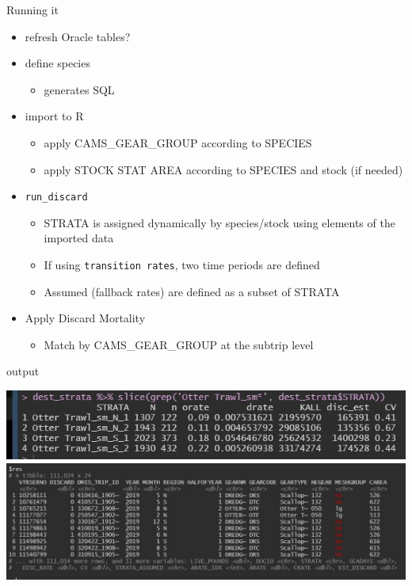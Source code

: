 \documentclass[
  ignorenonframetext,
]{beamer}
\providecommand{\tightlist}{%
  \setlength{\itemsep}{0pt}\setlength{\parskip}{0pt}}
\begin{document}
\begin{frame}[fragile]{Running it}
\protect\hypertarget{running-it}{}

\begin{itemize}
\tightlist
\item
  refresh Oracle tables?
\item
  define species

  \begin{itemize}
  \tightlist
  \item
    generates SQL
  \end{itemize}
\item
  import to R

  \begin{itemize}
  \tightlist
  \item
    apply CAMS\_GEAR\_GROUP according to SPECIES
  \item
    apply STOCK STAT AREA according to SPECIES and stock (if needed)
  \end{itemize}
\item
  \texttt{run\_discard}

  \begin{itemize}
  \tightlist
  \item
    STRATA is assigned dynamically by species/stock using elements of
    the imported data
  \item
    If using \texttt{transition\ rates}, two time periods are defined
  \item
    Assumed (fallback rates) are defined as a subset of STRATA
  \end{itemize}
\item
  Apply Discard Mortality

  \begin{itemize}
  \tightlist
  \item
    Match by CAMS\_GEAR\_GROUP at the subtrip level
  \end{itemize}
\end{itemize}

\end{frame}

\begin{frame}{output}
\protect\hypertarget{output}{}

\includegraphics[width = \textwidth]{dest_strata_squid_ex.jpg}
\vspace{2cm} \includegraphics[width = \textwidth]{squid_ex_table.jpg}

\end{frame}
\end{document}
